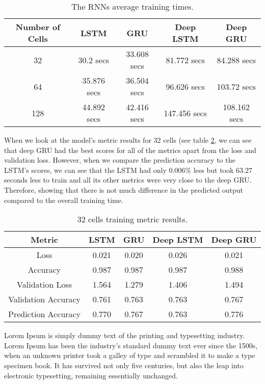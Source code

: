 \documentclass[a4paper,10pt]{article}
\begin{document}
	\begin{table}[ht]
		\centering
		\small
		\begin{tabular}[t]{ | c | c | c | c | c | }
			\hline
			Number of Cells & LSTM & GRU & Deep LSTM & Deep GRU \\ 
			\hline
			32 & 30.2 secs & 33.608 secs & 81.772 secs & 84.288 secs \\ 
			\hline
			64 & 35.876 secs & 36.504 secs & 96.626 secs & 103.72 secs  \\ 
			\hline
			128 & 44.892 secs & 42.416 secs & 147.456 secs & 108.162 secs \\
			\hline
		\end{tabular}
		\caption{The RNNs average training times.}
		\label{tab:training_time}
	\end{table}%

	When we look at the model's metric results for 32 cells (see table \ref{tab:32_metrics}, we can see that deep GRU had the best scores for all of the metrics apart from the loss and validation loss. However, when we compare the prediction accuracy to the LSTM's scores, we can see that the LSTM had only 0.006\% less but took 63.27 seconds less to train and all its other metrics were very close to the deep GRU. Therefore, showing that there is not much difference in the predicted output compared to the overall training time.


	\begin{table}[ht]
		\centering
		\small
		\begin{tabular}[t]{ | c | c | c | c | c | }
			\hline
			Metric          & LSTM  & GRU   & Deep LSTM & Deep GRU \\ 
			\hline
			Loss            & 0.021 & 0.020 & 0.026     & 0.021 \\ 
			\hline
			Accuracy        & 0.987 & 0.987 & 0.987     & 0.988  \\ 
			\hline
			Validation Loss & 1.564 & 1.279 & 1.406 & 1.494 \\
			\hline
			Validation Accuracy & 0.761 & 0.763 & 0.763 & 0.767 \\
			\hline
			Prediction Accuracy & 0.770     & 0.767 & 0.763     & 0.776 \\
			\hline 
		\end{tabular}
		\caption{32 cells training metric results.}
		\label{tab:32_metrics}
	\end{table}%

	Lorem Ipsum is simply dummy text of the printing and typesetting industry. Lorem Ipsum has been the industry's standard dummy text ever since the 1500s, when an unknown printer took a galley of type and scrambled it to make a type specimen book. It has survived not only five centuries, but also the leap into electronic typesetting, remaining essentially unchanged.
\end{document}
